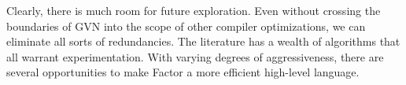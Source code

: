 Clearly, there is much room for future exploration.  Even without crossing the
boundaries of \gls{GVN} into the scope of other compiler optimizations, we can
eliminate all sorts of redundancies.  The literature has a wealth of algorithms
that all warrant experimentation.  With varying degrees of aggressiveness,
there are several opportunities to make Factor a more efficient high-level
language.
